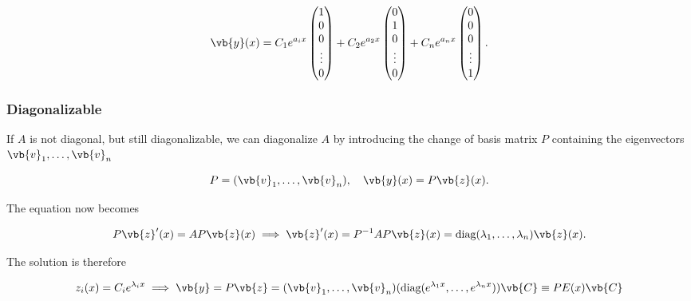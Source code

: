 \documentclass[english,a4paper,12pt]{report}
\begin{document}
\begin{equation}
    \vb{y} (x) = C_1 e^{a_{i}x }\begin{pmatrix}
         1 \\
         0 \\
         0 \\
         \vdots  \\
         0 \\
    \end{pmatrix} + C_2 e^{a_{2}x } \begin{pmatrix}
         0 \\
         1 \\
         0 \\
         \vdots  \\
         0 \\
    \end{pmatrix} + C_n e^{a_{n}x }  \begin{pmatrix}
         0 \\
         0 \\
         0 \\
         \vdots  \\
         1 \\
    \end{pmatrix}.
\end{equation}



\subsubsection{Diagonalizable}

If \(A\) is not diagonal, but still diagonalizable, we can diagonalize \(A\) by introducing the change of basis matrix \(P\) containing the eigenvectors \(\vb{v} _{1},\ldots ,\vb{v} _{n}  \) 

\begin{equation}
    P = (\vb{v} _1, \ldots ,  \vb{v} _n ), \quad \vb{y}(x) = P\vb{z}(x) .
\end{equation}

The equation now becomes 

\begin{equation}
    P\vb{z} '(x) = AP\vb{z} (x) \implies \vb{z} '(x) = P^{-1} AP \vb{z} (x) =  \text{diag} (\lambda _{1},\ldots ,\lambda _{n}  )\vb{z} (x).
\end{equation}

The solution is therefore

\begin{equation}  \label{homovec} 
    z_{i}(x) = C_{i}e^{\lambda _{i}x } \implies \vb{y} = P \vb{z} = (\vb{v}_1, \ldots , \vb{v} _n ) (\text{diag}(e^{\lambda _{1}x }, \ldots , e^{\lambda _{n}x }  ))\vb{C} \equiv PE(x)\vb{C}
\end{equation}
\end{document}
